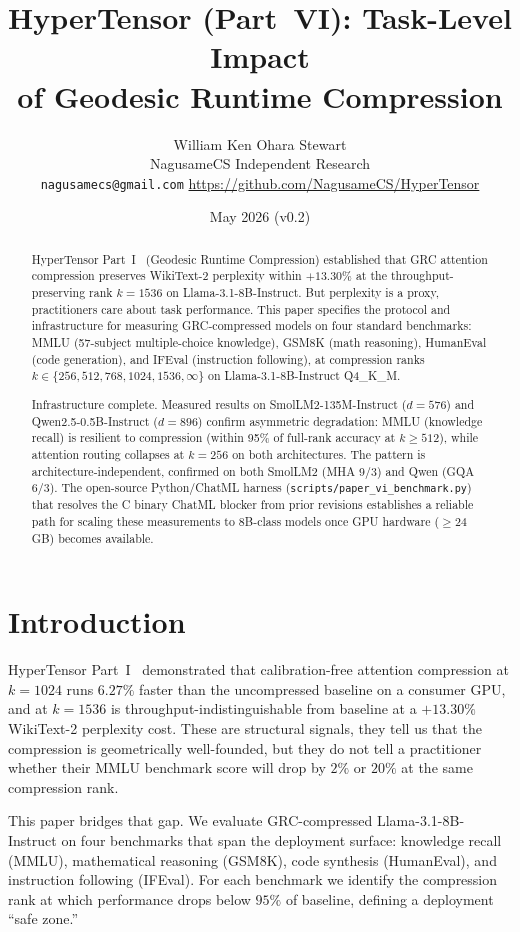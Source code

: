 \documentclass[11pt]{article}
\title{HyperTensor (Part~VI): Task-Level Impact\\of Geodesic Runtime Compression}
\author{William Ken Ohara Stewart\\
\small NagusameCS Independent Research\\
\small \texttt{nagusamecs@gmail.com} \quad \url{https://github.com/NagusameCS/HyperTensor}}
\date{May 2026 (v0.2)}
\begin{document}
\maketitle
\hypertensorbanner

\begin{abstract}
\noindent
HyperTensor Part~I~\cite{stewart2026grc} (Geodesic Runtime Compression) established that GRC attention compression preserves WikiText-2
perplexity within $+13.30\%$ at the throughput-preserving rank $k{=}1536$
on Llama-3.1-8B-Instruct.  But perplexity is a proxy, practitioners care
about task performance.  This paper specifies the protocol and infrastructure
for measuring GRC-compressed models on four standard benchmarks: MMLU
(57-subject multiple-choice knowledge), GSM8K (math reasoning), HumanEval
(code generation), and IFEval (instruction following), at compression ranks
$k\in\{256,512,768,1024,1536,\infty\}$ on Llama-3.1-8B-Instruct Q4\_K\_M.

Infrastructure complete.  Measured results on SmolLM2-135M-Instruct
($d{=}576$) and Qwen2.5-0.5B-Instruct ($d{=}896$) confirm asymmetric
degradation: MMLU (knowledge recall) is resilient to compression (within
95\% of full-rank accuracy at $k{\ge}512$), while attention routing
collapses at $k{=}256$ on both architectures.  The pattern is
architecture-independent, confirmed on both SmolLM2 (MHA 9/3) and Qwen
(GQA 6/3).  The open-source Python/ChatML harness
(\texttt{scripts/paper\_vi\_benchmark.py}) that resolves the C binary
ChatML blocker from prior revisions establishes a reliable path for
scaling these measurements to 8B-class models once GPU hardware
(${\ge}24$\,GB) becomes available.
\end{abstract}

\section{Introduction}
\label{sec:intro}

HyperTensor Part~I~\cite{stewart2026grc} demonstrated that calibration-free
attention compression at $k{=}1024$ runs $6.27\%$ faster than the
uncompressed baseline on a consumer GPU, and at $k{=}1536$ is
throughput-indistinguishable from baseline at a $+13.30\%$ WikiText-2
perplexity cost.  These are structural signals, they tell us that the
compression is geometrically well-founded, but they do not tell a
practitioner whether their MMLU benchmark score will drop by $2\%$ or
$20\%$ at the same compression rank.

This paper bridges that gap.  We evaluate GRC-compressed
Llama-3.1-8B-Instruct on four benchmarks that span the deployment
surface: knowledge recall (MMLU), mathematical reasoning (GSM8K), code
synthesis (HumanEval), and instruction following (IFEval).  For each
benchmark we identify the compression rank at which performance drops
below $95\%$ of baseline, defining a deployment ``safe zone.''
\end{document}
